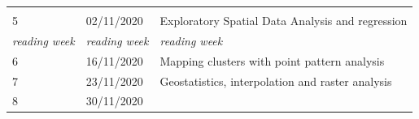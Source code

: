 \documentclass[
]{book}
\begin{document}
\begin{longtable}[]{@{}lll@{}}
\begin{minipage}[t]{0.49\columnwidth}
\end{minipage}\tabularnewline
\begin{minipage}[t]{0.23\columnwidth}\raggedright
5\strut
\end{minipage} & \begin{minipage}[t]{0.20\columnwidth}\raggedright
02/11/2020\strut
\end{minipage} & \begin{minipage}[t]{0.49\columnwidth}\raggedright
Exploratory Spatial Data Analysis and regression\strut
\end{minipage}\tabularnewline
\begin{minipage}[t]{0.23\columnwidth}\raggedright
\emph{reading week}\strut
\end{minipage} & \begin{minipage}[t]{0.20\columnwidth}\raggedright
\emph{reading week}\strut
\end{minipage} & \begin{minipage}[t]{0.49\columnwidth}\raggedright
\emph{reading week}\strut
\end{minipage}\tabularnewline
\begin{minipage}[t]{0.23\columnwidth}\raggedright
6\strut
\end{minipage} & \begin{minipage}[t]{0.20\columnwidth}\raggedright
16/11/2020\strut
\end{minipage} & \begin{minipage}[t]{0.49\columnwidth}\raggedright
Mapping clusters with point pattern analysis\strut
\end{minipage}\tabularnewline
\begin{minipage}[t]{0.23\columnwidth}\raggedright
7\strut
\end{minipage} & \begin{minipage}[t]{0.20\columnwidth}\raggedright
23/11/2020\strut
\end{minipage} & \begin{minipage}[t]{0.49\columnwidth}\raggedright
Geostatistics, interpolation and raster analysis\strut
\end{minipage}\tabularnewline
\begin{minipage}[t]{0.23\columnwidth}\raggedright
8\strut
\end{minipage} & \begin{minipage}[t]{0.20\columnwidth}\raggedright
30/11/2020\strut
\end{minipage} & \begin{minipage}[t]{0.49\columnwidth}\raggedright

\end{minipage}
\end{longtable}
\end{document}
